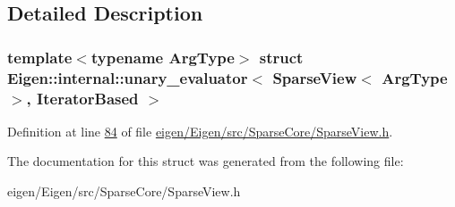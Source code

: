 \subsection{Detailed Description}
\subsubsection*{template$<$typename Arg\+Type$>$\newline
struct Eigen\+::internal\+::unary\+\_\+evaluator$<$ Sparse\+View$<$ Arg\+Type $>$, Iterator\+Based $>$}



Definition at line \hyperlink{eigen_2_eigen_2src_2_sparse_core_2_sparse_view_8h_source_l00084}{84} of file \hyperlink{eigen_2_eigen_2src_2_sparse_core_2_sparse_view_8h_source}{eigen/\+Eigen/src/\+Sparse\+Core/\+Sparse\+View.\+h}.



The documentation for this struct was generated from the following file\+:\begin{DoxyCompactItemize}
\item 
eigen/\+Eigen/src/\+Sparse\+Core/\+Sparse\+View.\+h\end{DoxyCompactItemize}

